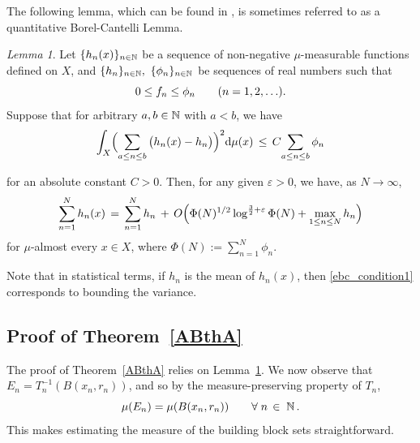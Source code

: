\documentclass[11pt,reqno]{amsart}
\newcommand{\N}{{\Bbb N}}
\newcommand{\0}{\mathbf{0}}
\newtheorem{lemma}{Lemma}
\theoremstyle{remark}
\numberwithin{equation}{section}
\newtheorem{lemma}[theorem]{Lemma}
\theoremstyle{remark}
\numberwithin{equation}{section}
\begin{document}
The following lemma, which can be found in \cite[pg 13]{harman}, is sometimes referred to as a quantitative Borel-Cantelli Lemma.
\begin{lemma} \label{ebc}
Let $\{h_n(x)\}_{n \in \N}$ be a sequence of non-negative $\mu$-measurable functions defined on $X$, and $\{h_n\}_{n \in \N },\ \{\phi_n\}_{n  \in \N}$ be sequences of real numbers  such that
\begin{equation*}  0\leq f_n \leq \phi_n \hspace{7mm} (n=1,2,\ldots).  \end{equation*}
\noindent
Suppose that for arbitrary  $a,b \in \N$ with $a <  b$, we have
\begin{equation} \label{ebc_condition1}
\int_{X} \Bigl(\sum_{a \leq n \leq b} \big( h_n(x) -  h_n \big) \Bigr)^2\mathrm{d}\mu(x)\, \leq\,  C\!\sum_{a \leq n\leq b}\phi_n
\end{equation}

\noindent for an absolute constant $C>0$. Then, for any given $\varepsilon>0$,  we have, as $N \to \infty$,
\begin{equation} \label{ebc_conclusion}
\sum_{n=1}^N h_n(x)\, =\, \sum_{n=1}^{N}h_n\, +\, O\Bigl(\Phi(N)^{1/2}\log^{\frac{3}{2}+\varepsilon}\Phi(N)+\max_{1\leq n\leq N}h_n\Bigr)
\end{equation}
\noindent for $\mu$-almost every $x\in X$, where $
\Phi(N):= \sum\limits_{n=1}^{N}\phi_n
$. %

\end{lemma}
Note that in statistical terms, if $h_n$ is the mean of $h_n(x)$, then \eqref{ebc_condition1} corresponds to bounding the variance.

    
\subsection{Proof of Theorem~\ref{ABthA}} \label{pfthm4}
The proof of Theorem~\ref{ABthA} relies on Lemma~\ref{ebc}. We now observe that  $E_n=T_n^{-1}(B(x_n,r_n))$, and so by the measure-preserving property of $T_n$, 
\begin{equation}\label{condmpt}
\mu(E_n) = \mu(B(x_n,r_n)) \qquad \forall \; n \, \in \; \N \, .
\end{equation}
This makes estimating the measure of the building block sets straightforward.
\end{document}
